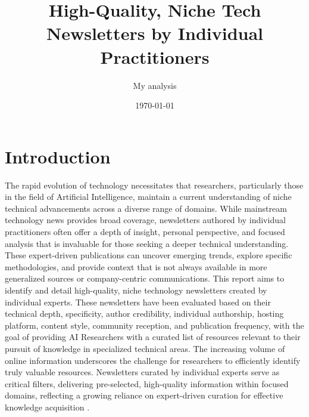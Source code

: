 \documentclass[11pt]{article}
\title{High-Quality, Niche Tech Newsletters by Individual Practitioners}
\author{My analysis}
\date{\today}
\begin{document}
\maketitle

\section{Introduction}
The rapid evolution of technology necessitates that researchers, particularly those in the field of Artificial Intelligence, maintain a current understanding of niche technical advancements across a diverse range of domains. While mainstream technology news provides broad coverage, newsletters authored by individual practitioners often offer a depth of insight, personal perspective, and focused analysis that is invaluable for those seeking a deeper technical understanding. These expert-driven publications can uncover emerging trends, explore specific methodologies, and provide context that is not always available in more generalized sources or company-centric communications. This report aims to identify and detail high-quality, niche technology newsletters created by individual experts. These newsletters have been evaluated based on their technical depth, specificity, author credibility, individual authorship, hosting platform, content style, community reception, and publication frequency, with the goal of providing AI Researchers with a curated list of resources relevant to their pursuit of knowledge in specialized technical areas. The increasing volume of online information underscores the challenge for researchers to efficiently identify truly valuable resources. Newsletters curated by individual experts serve as critical filters, delivering pre-selected, high-quality information within focused domains, reflecting a growing reliance on expert-driven curation for effective knowledge acquisition \citep{favikon2025orosz}.
\end{document}
